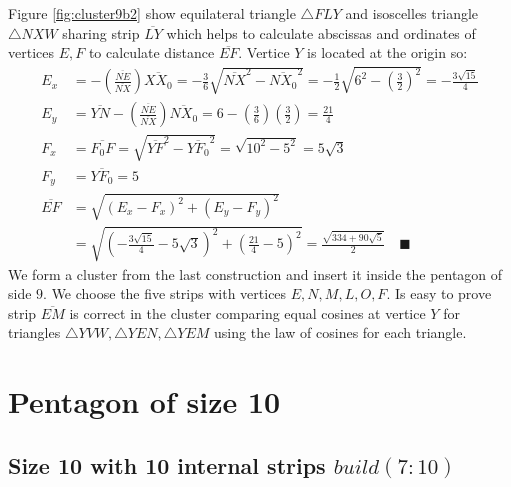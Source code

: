\documentclass[11pt]{article}
\begin{document}
Figure \ref{fig:cluster9b2} show equilateral triangle $\triangle{FLY}$ and isoscelles triangle $\triangle{NXW}$ sharing strip $\overline{LY}$ which helps to calculate abscissas and ordinates of vertices $E,F$ to calculate distance $\overline{EF}$. Vertice $Y$ is located at the origin so:
\begin{align}
E_x &= - \left(\frac{\overline{NE}}{\overline{NX}}\right)\overline{XX_0}
 = -\frac{3}6\sqrt{\overline{NX}^2 - \overline{NX_0}^2}
 = -\frac{1}{2}\sqrt{6^2 - \left(\frac{3}2\right)^2} = -\frac{3\sqrt{15}}4 \\
E_y &= \overline{YN} - \left(\frac{\overline{NE}}{\overline{NX}}\right)\overline{NX_0}
 = 6 - \left(\frac{3}6\right)\left(\frac{3}2\right) = \frac{21}4\\
F_x &= \overline{F_0F} = \sqrt{\overline{YF}^2 - \overline{YF_0}^2}
 = \sqrt{10^2 - 5^2} = 5\sqrt3\\
F_y &= \overline{YF_0} = 5\\
\overline{EF} &= \sqrt{(E_x - F_x)^2 + (E_y - F_y)^2} \nonumber\\
 &= \sqrt{\left(-\frac{3\sqrt{15}}{4} -5\sqrt3 \right)^2 + \left(\frac{21}4 - 5\right)^2}
 = \frac{\sqrt{334+90\sqrt5}}2 \quad\blacksquare
\end{align}
We form a cluster from the last construction and insert it inside the pentagon of side $9$. We choose the five strips with vertices $E,N,M,L,O,F$. Is easy to prove strip $\overline{EM}$ is correct in the cluster comparing equal cosines at vertice $Y$ for triangles $\triangle{YVW},\triangle{YEN},\triangle{YEM}$ using the law of cosines for each triangle.



\section{Pentagon of size 10}

\subsection{Size 10 with 10 internal strips $build(7:10)$}
\end{document}
